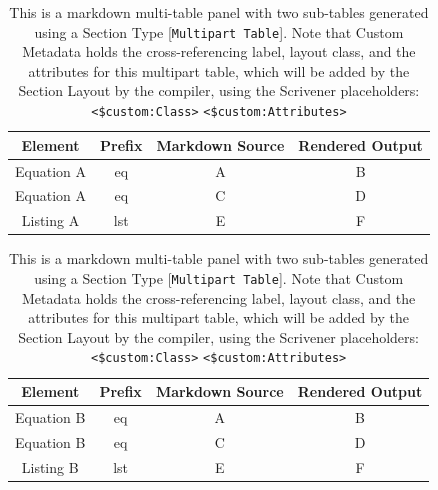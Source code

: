 \documentclass[
  12pt,
  a4paper,
  oneside,
  titlepage,
  toclink=all,
  toc=bibliography]{scrbook}
\theoremstyle{definition}
\theoremstyle{plain}
\theoremstyle{plain}
\theoremstyle{plain}
\theoremstyle{plain}
\theoremstyle{definition}
\theoremstyle{definition}
\theoremstyle{plain}
\theoremstyle{remark}
\begin{document}
\begin{table}

\begin{minipage}[t]{\linewidth}

{\centering 

\begin{tabular}[t]{cccc}
\toprule
\textbf{Element} & \textbf{Prefix} & \textbf{Markdown
Source} & \textbf{Rendered Output}\\
\midrule
Equation A & eq & A & B\\
Equation A & eq & C & D\\
Listing A & lst & E & F\\
\bottomrule
\end{tabular}

}

\end{minipage}%
\newline
\begin{minipage}[t]{\linewidth}

{\centering 

\begin{tabular}[t]{cccc}
\toprule
\textbf{Element} & \textbf{Prefix} & \textbf{Markdown
Source} & \textbf{Rendered Output}\\
\midrule
Equation B & eq & A & B\\
Equation B & eq & C & D\\
Listing B & lst & E & F\\
\bottomrule
\end{tabular}

}

\end{minipage}%

\caption{\label{tbl-scriv33}This is a markdown multi-table panel with
two sub-tables generated using a Section Type
{[}\texttt{Multipart\ Table}{]}. Note that Custom Metadata holds the
cross-referencing label, layout class, and the attributes for this
multipart table, which will be added by the Section Layout by the
compiler, using the Scrivener placeholders:
\texttt{\textless{}\hspace{0pt}\$\hspace{0pt}\hspace{0pt}custom:Class\textgreater{}}
\texttt{\textless{}\hspace{0pt}\$\hspace{0pt}\hspace{0pt}custom:Attributes\textgreater{}}}

\end{table}
\end{document}
